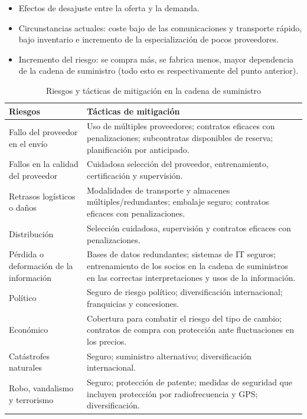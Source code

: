 \documentclass[12pt]{book} %
\providecommand{\tightlist}{%
  \setlength{\itemsep}{0pt}\setlength{\parskip}{0pt}}
\begin{document}
\begin{itemize}
\tightlist
\item
  Efectos de desajuste entre la oferta y la demanda.
\item
  Circunstancias actuales: coste bajo de las comunicaciones y transporte
  rápido, bajo inventario e incremento de la especialización de pocos
  proveedores.
\item
  Incremento del riesgo: se compra más, se fabrica menos, mayor
  dependencia de la cadena de suministro (todo esto es respectivamente
  del punto anterior).
\end{itemize}

\begin{table}[H]
\centering
\caption{Riesgos y tácticas de mitigación en la cadena de suministro}
\begin{tabular}{|p{6cm}|p{10cm}|}
\hline
\textbf{Riesgos} & \textbf{Tácticas de mitigación} \\ \hline
Fallo del proveedor en el envío & Uso de múltiples proveedores; contratos eficaces con penalizaciones; subcontratas disponibles de reserva; planificación por anticipado. \\ \hline
Fallos en la calidad del proveedor & Cuidadosa selección del proveedor, entrenamiento, certificación y supervisión. \\ \hline
Retrasos logísticos o daños & Modalidades de transporte y almacenes múltiples/redundantes; embalaje seguro; contratos eficaces con penalizaciones. \\ \hline
Distribución & Selección cuidadosa, supervisión y contratos eficaces con penalizaciones. \\ \hline
Pérdida o deformación de la información & Bases de datos redundantes; sistemas de IT seguros; entrenamiento de los socios en la cadena de suministros en las correctas interpretaciones y usos de la información. \\ \hline
Político & Seguro de riesgo político; diversificación internacional; franquicias y concesiones. \\ \hline
Económico & Cobertura para combatir el riesgo del tipo de cambio; contratos de compra con protección ante fluctuaciones en los precios. \\ \hline
Catástrofes naturales & Seguro; suministro alternativo; diversificación internacional. \\ \hline
Robo, vandalismo y terrorismo & Seguro; protección de patente; medidas de seguridad que incluyen protección por radiofrecuencia y GPS; diversificación. \\ \hline
\end{tabular}
\end{table}
\end{document}
